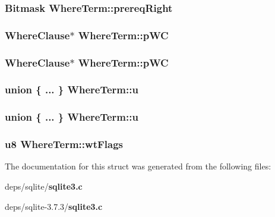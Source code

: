 \subsubsection{\setlength{\rightskip}{0pt plus 5cm}\bf{Bitmask} \bf{Where\-Term::prereq\-Right}}\label{structWhereTerm_eac74e8a3ee92dd6ae6d32a8ddf33922}


\subsubsection{\setlength{\rightskip}{0pt plus 5cm}\bf{Where\-Clause}$\ast$ \bf{Where\-Term::p\-WC}}\label{structWhereTerm_19ad74063ab0dcd08ad5db2109595f9d}


\subsubsection{\setlength{\rightskip}{0pt plus 5cm}\bf{Where\-Clause}$\ast$ \bf{Where\-Term::p\-WC}}\label{structWhereTerm_19ad74063ab0dcd08ad5db2109595f9d}


\subsubsection{\setlength{\rightskip}{0pt plus 5cm}union \{ ... \}   \bf{Where\-Term::u}}\label{structWhereTerm_3660ad412b1bb2acc1d920eb548f9a6a}


\subsubsection{\setlength{\rightskip}{0pt plus 5cm}union \{ ... \}   \bf{Where\-Term::u}}\label{structWhereTerm_ee3376a67cddd8a86e97d7d2b663134f}


\subsubsection{\setlength{\rightskip}{0pt plus 5cm}\bf{u8} \bf{Where\-Term::wt\-Flags}}\label{structWhereTerm_6d595d003e8a0a489367b1f716754903}




The documentation for this struct was generated from the following files:\begin{CompactItemize}
\item 
deps/sqlite/\bf{sqlite3.c}\item 
deps/sqlite-3.7.3/\bf{sqlite3.c}\end{CompactItemize}
